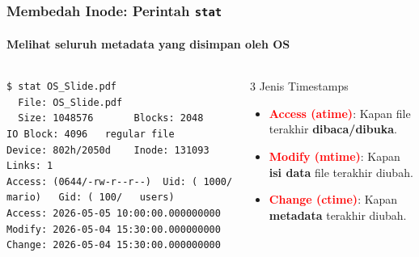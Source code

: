 \documentclass[t,aspectratio=169,xcolor=dvipsnames]{beamer}
\newcommand{\tem}[1]{\textbf{\textcolor{red}{#1}}}
\begin{document}
\begin{frame}[fragile,shrink=5]
    \frametitle{Membedah Inode: Perintah \texttt{stat}}
    \framesubtitle{Melihat seluruh metadata yang disimpan oleh OS}
    \small

    \begin{columns}[T]
\begin{lstlisting}[basicstyle=\ttfamily\tiny, backgroundcolor=\color{gray!10}]
$ stat OS_Slide.pdf
  File: OS_Slide.pdf
  Size: 1048576       Blocks: 2048       IO Block: 4096   regular file
Device: 802h/2050d    Inode: 131093      Links: 1
Access: (0644/-rw-r--r--)  Uid: ( 1000/   mario)   Gid: ( 100/   users)
Access: 2026-05-05 10:00:00.000000000
Modify: 2026-05-04 15:30:00.000000000
Change: 2026-05-04 15:30:00.000000000
\end{lstlisting}

        \begin{alertblock}{3 Jenis Timestamps}
            \begin{itemize}
                \item \tem{Access (atime)}: Kapan file terakhir \textbf{dibaca/dibuka}.
                \item \tem{Modify (mtime)}: Kapan \textbf{isi data} file terakhir diubah.
                \item \tem{Change (ctime)}: Kapan \textbf{metadata} terakhir diubah.
            \end{itemize}
        \end{alertblock}
    \end{columns}
\end{frame}
\end{document}
